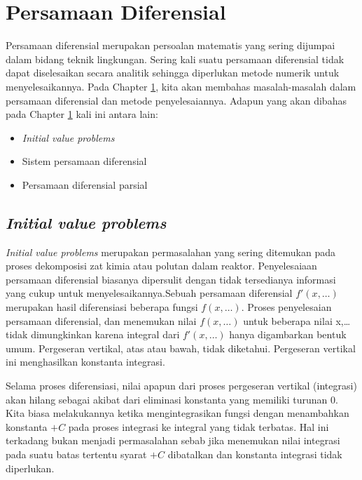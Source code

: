 \documentclass[
]{book}
\providecommand{\tightlist}{%
  \setlength{\itemsep}{0pt}\setlength{\parskip}{0pt}}
\theoremstyle{definition}
\theoremstyle{definition}
\theoremstyle{definition}
\theoremstyle{definition}
\theoremstyle{remark}
\begin{document}
\hypertarget{diffeq}{%
\chapter{Persamaan Diferensial}\label{diffeq}}

Persamaan diferensial merupakan persoalan matematis yang sering dijumpai dalam bidang teknik lingkungan. Sering kali suatu persamaan diferensial tidak dapat diselesaikan secara analitik sehingga diperlukan metode numerik untuk menyelesaikannya. Pada Chapter \ref{diffeq}, kita akan membahas masalah-masalah dalam persamaan diferensial dan metode penyelesaiannya. Adapun yang akan dibahas pada Chapter \ref{diffeq} kali ini antara lain:

\begin{itemize}
\tightlist
\item
  \emph{Initial value problems}
\item
  Sistem persamaan diferensial
\item
  Persamaan diferensial parsial
\end{itemize}

\hypertarget{ivp}{%
\section{\texorpdfstring{\emph{Initial value problems}}{Initial value problems}}\label{ivp}}

\emph{Initial value problems} merupakan permasalahan yang sering ditemukan pada proses dekomposisi zat kimia atau polutan dalam reaktor. Penyelesaiaan persamaan diferensial biasanya dipersulit dengan tidak tersedianya informasi yang cukup untuk menyelesaikannya.Sebuah persamaan diferensial \(f'\left(x,\dots\right)\) merupakan hasil diferensiasi beberapa fungsi \(f\left(x,\dots\right)\). Proses penyelesaian persamaan diferensial, dan menemukan nilai \(f \left(x,\dots\right)\) untuk beberapa nilai x,\ldots{} tidak dimungkinkan karena integral dari \(f'\left(x,\dots\right)\) hanya digambarkan bentuk umum. Pergeseran vertikal, atas atau bawah, tidak diketahui. Pergeseran vertikal ini menghasilkan konstanta integrasi.

Selama proses diferensiasi, nilai apapun dari proses pergeseran vertikal (integrasi) akan hilang sebagai akibat dari eliminasi konstanta yang memiliki turunan 0. Kita biasa melakukannya ketika mengintegrasikan fungsi dengan menambahkan konstanta \(+ C\) pada proses integrasi ke integral yang tidak terbatas. Hal ini terkadang bukan menjadi permasalahan sebab jika menemukan nilai integrasi pada suatu batas tertentu syarat \(+ C\) dibatalkan dan konstanta integrasi tidak diperlukan.
\end{document}
